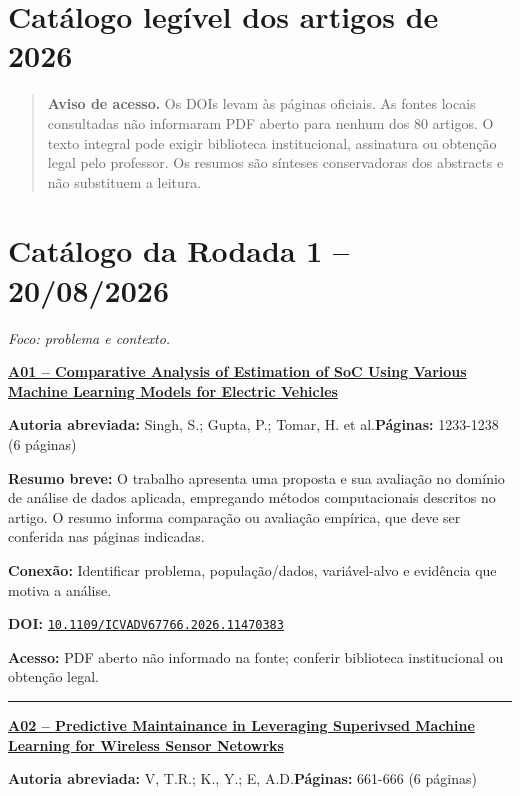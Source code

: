 \documentclass[10pt,a4paper]{article}
\newenvironment{AccessBox}{\par\smallskip\begin{quote}\small}{\end{quote}\par\smallskip}
\begin{document}
\section*{Catálogo legível dos artigos de 2026}
\begin{AccessBox}
\textbf{Aviso de acesso.} Os DOIs levam às páginas oficiais. As fontes locais consultadas não informaram PDF aberto para nenhum dos 80 artigos. O texto integral pode exigir biblioteca institucional, assinatura ou obtenção legal pelo professor. Os resumos são sínteses conservadoras dos abstracts e não substituem a leitura.
\end{AccessBox}
\clearpage
\section*{Catálogo da Rodada 1 -- 20/08/2026}
\textit{Foco: problema e contexto.}
\par\medskip\noindent
{\large\bfseries\href{https://doi.org/10.1109/ICVADV67766.2026.11470383}{A01 -- Comparative Analysis of Estimation of SoC Using Various Machine Learning Models for Electric Vehicles}}\par\smallskip
\textbf{Autoria abreviada:} Singh, S.; Gupta, P.; Tomar, H. et al.\quad \textbf{Páginas:} 1233-1238 (6 páginas)\par
\textbf{Resumo breve:} O trabalho apresenta uma proposta e sua avaliação no domínio de análise de dados aplicada, empregando métodos computacionais descritos no artigo. O resumo informa comparação ou avaliação empírica, que deve ser conferida nas páginas indicadas.\par
\textbf{Conexão:} Identificar problema, população/dados, variável-alvo e evidência que motiva a análise.\par
\textbf{DOI:} \href{https://doi.org/10.1109/ICVADV67766.2026.11470383}{\nolinkurl{10.1109/ICVADV67766.2026.11470383}}\par
\textbf{Acesso:} PDF aberto não informado na fonte; conferir biblioteca institucional ou obtenção legal.\par
\noindent\rule{\textwidth}{0.35pt}
\par\medskip\noindent
{\large\bfseries\href{https://doi.org/10.1109/ICVADV67766.2026.11469842}{A02 -- Predictive Maintainance in Leveraging Superivsed Machine Learning for Wireless Sensor Netowrks}}\par\smallskip
\textbf{Autoria abreviada:} V, T.R.; K., Y.; E, A.D.\quad \textbf{Páginas:} 661-666 (6 páginas)\par
\end{document}

